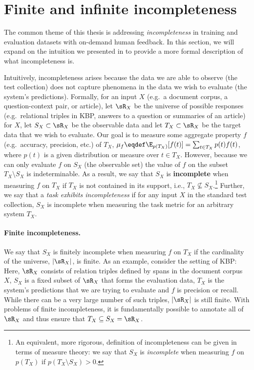 \section{\label{sec:setup:incompleteness} Finite and infinite incompleteness}

The common theme of this thesis is addressing \textit{incompleteness} in training and evaluation datasets with on-demand human feedback. 
In this section, we will expand on the intuition we presented in  to provide a more formal description of what incompleteness is.

Intuitively, incompleteness arises because the data we are able to observe (the test collection)  does not capture phenomena in the data we wish to evaluate (the system's predictions).
Formally,
  for an input $X$ (e.g.\ a document corpus, a question-context pair, or article),
  let $\sR_X$ be the universe of possible responses (e.g.\ relational triples in KBP, answers to a question or summaries of an article) for $X$,
  let $S_X \subset \sR_X$ be the observable data
  and let $T_X \subset \sR_X$ be the target data that we wish to evaluate.
Our goal is to measure some aggregate property $f$ (e.g.\
accuracy, precision, etc.) of $T_X$, $\mu_f \eqdef \E_{p(T_X)}[f(t)] = \sum_{t \in T_X} p(t) f(t)$, where $p(t)$ is a given distribution or measure over $t \in T_X$.
However, because we can only evaluate $f$ on $S_X$ (the observable set) the value of $f$ on the subset $T_X \setminus S_X$ is indeterminable.
As a result, we say that $S_X$ is \textbf{incomplete} when measuring $f$ on $T_X$ if $T_X$ is not contained in its support, i.e., $T_X \not\subseteq S_X$.\footnote{%
An equivalent, more rigorous, definition of incompleteness can be given in terms of measure theory: we say that $S_X$ is \textit{incomplete} when measuring $f$ on $p(T_X)$ if $p(T_X \setminus S_X) > 0$.
}
Further, we say that a \textit{task exhibits incompleteness} if for any input $X$ in the standard test collection, $S_X$ is incomplete when measuring the task metric for an arbitrary system $T_X$.

\paragraph{Finite incompleteness.}
We say that $S_X$ is finitely incomplete when measuring $f$ on $T_X$ if the cardinality of the universe, $|\sR_X|$, is finite.
As an example, consider the setting of KBP:\@
Here, $\sR_X$ consists of relation triples defined by spans in the document corpus $X$, $S_X$ is a fixed subset of $\sR_X$ that forms the evaluation data, $T_X$ is the system's predictions that we are trying to evaluate and $f$ is precision or recall.
While there can be a very large number of such triples, $|\sR_X|$ is still finite.
With problems of finite incompleteness, it is fundamentally possible to annotate all of $\sR_X$ and thus ensure that $T_X \subseteq S_X = \sR_X$.


